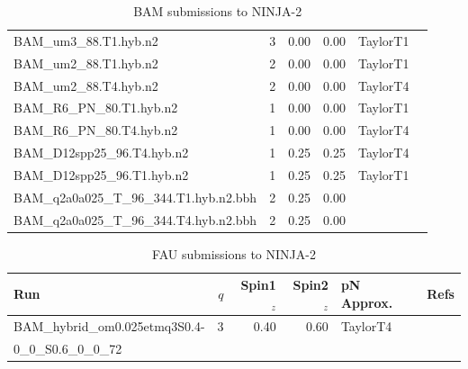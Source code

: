 \begin{table}
\begin{center}
\begin{tabular}{|l|r|r|r|l|c|}
BAM\_um3\_88.T1.hyb.n2 & 3 & 0.00 & 0.00 & TaylorT1 & \cite{Hannam:2007wf,Brugmann:2008zz} \\
BAM\_um2\_88.T1.hyb.n2 & 2 & 0.00 & 0.00 & TaylorT1 & \cite{Hannam:2007wf,Brugmann:2008zz} \\
BAM\_um2\_88.T4.hyb.n2 & 2 & 0.00 & 0.00 & TaylorT4 & \cite{Hannam:2007wf,Brugmann:2008zz} \\
BAM\_R6\_PN\_80.T1.hyb.n2 & 1 & 0.00 & 0.00 & TaylorT1 & \cite{Hannam:2007wf,Brugmann:2008zz} \\
BAM\_R6\_PN\_80.T4.hyb.n2 & 1 & 0.00 & 0.00 & TaylorT4 & \cite{Hannam:2007wf,Brugmann:2008zz} \\
BAM\_D12spp25\_96.T4.hyb.n2 & 1 & 0.25 & 0.25 & TaylorT4 & \cite{Hannam:2007wf,Brugmann:2008zz} \\
BAM\_D12spp25\_96.T1.hyb.n2 & 1 & 0.25 & 0.25 & TaylorT1 & \cite{Hannam:2007wf,Brugmann:2008zz} \\
BAM\_q2a0a025\_T\_96\_344.T1.hyb.n2.bbh & 2 & 0.25 & 0.00 & {} & \cite{,Brugmann:2008zz} \\
BAM\_q2a0a025\_T\_96\_344.T4.hyb.n2.bbh & 2 & 0.25 & 0.00 & {} & \cite{,Brugmann:2008zz} \\
\hline
\end{tabular}
\end{center}
\caption[BAM submissions to NINJA-2]{
\label{tab:ninja2_bam}
BAM submissions to NINJA-2}
\end{table}

\begin{table}
\begin{center}
\begin{tabular}{|l|r|r|r|l|c|}
\hline
Run & $q$ & Spin1${}_z$ & Spin2${}_z$ & pN Approx. & Refs \\
\hline
BAM\_hybrid\_om0.025etmq3S0.4- & 3 & 0.40 & 0.60 & TaylorT4 & \cite{none,???} \\
0\_0\_S0.6\_0\_0\_72 &  &  &  &  &  \\
\hline
\end{tabular}
\end{center}
\caption[FAU submissions to NINJA-2]{
\label{tab:ninja2_fau}
FAU submissions to NINJA-2}
\end{table}


